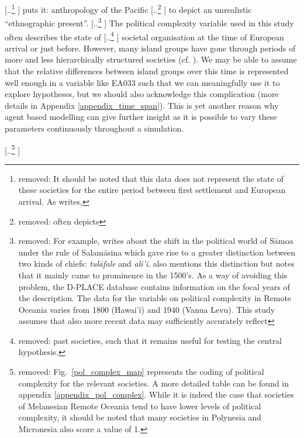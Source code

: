 \documentclass[unnumsec,webpdf,modern,medium]{oup-authoring-template}
\providecommand{\DIFaddtex}[1]{{\protect\color{blue} \sf #1}} %
\providecommand{\DIFdeltex}[1]{{\protect\color{red} [..\footnote{removed: #1} ]}} %
\providecommand{\DIFaddbegin}{} %
\providecommand{\DIFaddend}{} %
\providecommand{\DIFdelbegin}{} %
\providecommand{\DIFdelend}{} %
\providecommand{\DIFadd}[1]{\texorpdfstring{\DIFaddtex{#1}}{#1}} %
\providecommand{\DIFdel}[1]{\texorpdfstring{\DIFdeltex{#1}}{}} %
\newcommand{\DIFscaledelfig}{0.5}
\newlength{\DIFdelgraphicswidth} %
\newlength{\DIFdelgraphicsheight} %
\newcommand{\DIFaddincludegraphics}[2][]{{\color{blue}\fbox{\DIFOincludegraphics[#1]{#2}}}} %
\newcommand{\DIFdelincludegraphics}[2][]{%
\sbox{\DIFdelgraphicsbox}{\DIFOincludegraphics[#1]{#2}}%
\settoboxwidth{\DIFdelgraphicswidth}{\DIFdelgraphicsbox} %
\settoboxtotalheight{\DIFdelgraphicsheight}{\DIFdelgraphicsbox} %
\scalebox{\DIFscaledelfig}{%
\parbox[b]{\DIFdelgraphicswidth}{\usebox{\DIFdelgraphicsbox}\\[-\baselineskip] \rule{\DIFdelgraphicswidth}{0em}}\llap{\resizebox{\DIFdelgraphicswidth}{\DIFdelgraphicsheight}{%
\setlength{\unitlength}{\DIFdelgraphicswidth}%
\begin{picture}(1,1)%
\thicklines\linethickness{2pt} %
{\color[rgb]{1,0,0}\put(0,0){\framebox(1,1){}}}%
{\color[rgb]{1,0,0}\put(0,0){\line( 1,1){1}}}%
{\color[rgb]{1,0,0}\put(0,1){\line(1,-1){1}}}%
\end{picture}%
}\hspace*{3pt}}} %
} %
\DeclareRobustCommand{\DIFaddbegin}{\DIFOaddbegin \let\includegraphics\DIFaddincludegraphics} %
\DeclareRobustCommand{\DIFaddend}{\DIFOaddend \let\includegraphics\DIFOincludegraphics} %
\DeclareRobustCommand{\DIFdelbegin}{\DIFOdelbegin \let\includegraphics\DIFdelincludegraphics} %
\DeclareRobustCommand{\DIFdelend}{\DIFOaddend \let\includegraphics\DIFOincludegraphics} %
\begin{document}
\DIFdel{It should be noted that this data does not represent the state of these societies for the entire period between first settlement and European arrival. As \citet{meleisea1995}writes, }\DIFdelend \DIFaddbegin \DIFadd{puts it: }\DIFaddend anthropology of the Pacific \DIFdelbegin \DIFdel{often depicts }\DIFdelend \DIFaddbegin \DIFadd{to depict }\DIFaddend an unrealistic ``ethnographic present''. \DIFdelbegin \DIFdel{For example, \citet[185]{schoeffel87} writes about the shift in the political world of S\={a}moa under the rule of Salam\={a}sina which gave rise to a greater distinction between two kinds of chiefs: \emph{tul\={a}fale} and \emph{ali'i}. \citet[249]{kirch2017road} also mentions this distinction but notes that it mainly came to prominence in the 1500's. As a way of avoiding this problem, the D-PLACE database \citep{d_place_all} contains information on the focal years of the description. The data for the variable on political complexity in Remote Oceania varies from 1800 (Hawai'i) and 1940 (Vanua Levu). This study assumes that also more recent data may sufficiently accurately reflect }\DIFdelend \DIFaddbegin \DIFadd{The political complexity variable used in this study often describes }\DIFaddend the state of \DIFdelbegin \DIFdel{past societies, such that it remains useful for testing the central hypothesis.
}\DIFdelend \DIFaddbegin \DIFadd{societal organisation at the time of European arrival or just before. However, many island groups have gone through periods of more and less hierarchically structured societies (cf. \citet[178-183]{skirgaard2020multilevel}). We may be able to assume that the relative differences between island groups over this time is represented well enough in a variable like EA033 such that we can meaningfully use it to explore hypotheses, but we should also acknowledge this complication (more details in Appendix \ref{appendix_time_span}). This is yet another reason why agent based modelling can give further insight as it is possible to vary these parameters continuously throughout a simulation.
}\DIFaddend 

\DIFdelbegin \DIFdel{Fig.~\ref{pol_complex_map} represents the coding of political complexity for the relevant societies. A more detailed table can be found in appendix \ref{appendix_pol_complex}. While it is indeed the case that societies of Melanesian Remote Oceania tend to have lower levels of political complexity, it should be noted that many societies in Polynesia and Micronesia also score a value of 1.
}\DIFdelend %
\end{document}
